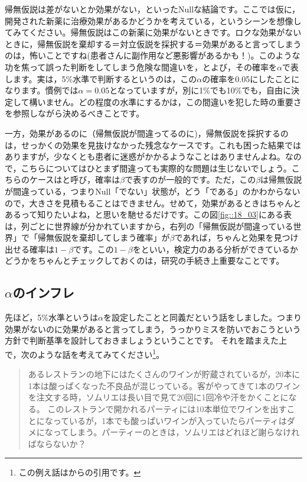 \documentclass{ltjsarticle}
\begin{document}
帰無仮説は差がないとか効果がない，といったNullな結論です。ここでは仮に，開発された新薬に治療効果があるかどうかを考えている，というシーンを想像してみてください。帰無仮説はこの新薬に効果がないときです。ロクな効果がないときに，帰無仮説を棄却する＝対立仮説を採択する＝効果があると言ってしまうのは，怖いことですね(患者さんに副作用など悪影響があるかも！)。このような功を焦って誤った判断をしてしまう危険な間違いを，とよび，その確率を$\alpha$で表します。実は，5\%水準で判断するというのは，この$\alpha$の確率を0.05にしたことになります。慣例では$\alpha=0.05$となっていますが，別に1\%でも10\%でも，自由に決定して構いません。どの程度の水準にするかは，この間違いを犯した時の重要さを参照しながら決めるべきことです。

一方，効果があるのに（帰無仮説が間違ってるのに)，帰無仮説を採択するのは，せっかくの効果を見抜けなかった残念なケースです。これも困った結果ではありますが，少なくとも患者に迷惑がかかるようなことはありませんよね。なので，こちらについてはひとまず間違っても実際的な問題は生じないでしょう。こちらのケースはと呼び，確率は$\beta$で表すのが一般的です。ただ，この$\beta$は帰無仮説が間違っている，つまりNull「でない」状態が，どう「である」のかわからないので，大きさを見積もることはできません。せめて，効果があるときはちゃんとあるって知りたいよね，と思いを馳せるだけです。この図\ref{fig::18_03}にある表は，列ごとに世界線が分かれていますから，右列の「帰無仮説が間違っている世界」で「帰無仮説を棄却してしまう確率」が$\beta$であれば，ちゃんと効果を見つけ出せる確率は$1-\beta$です。この$1-\beta$をといい，検定力のある分析ができているかどうかをちゃんとチェックしておくのは，研究の手続き上重要なことです。

\subsection{$\alpha$のインフレ}
\label{alphaInfration}
先ほど，5\%水準というは$\alpha$を設定したことと同義だという話をしました。つまり効果がないのに効果があると言ってしまう，うっかりミスを防いでおこうという方針で判断基準を設計しておきましょうということです。
それを踏まえた上で，次のような話を考えてみてください\footnote{この例え話は\citet{BA33892274}からの引用です。}。
\begin{quote}
あるレストランの地下にはたくさんのワインが貯蔵されているが，20本に1本は酸っぱくなった不良品が混じっている。客がやってきて1本のワインを注文する時，ソムリエは長い目で見て20回に1回冷や汗をかくことになる。
このレストランで開かれるパーティには10本単位でワインを出すことになっているが，1本でも酸っぱいワインが入っていたらパーティはダメになってしまう。パーティーのときは，ソムリエはどれほど謝らなければならないか？
\end{quote}
\end{document}

